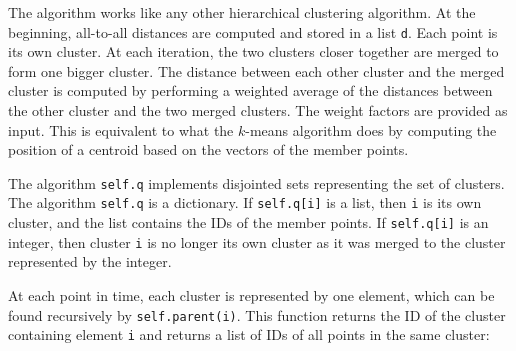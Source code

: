 \documentclass[justified,sixbynine]{tufte-book}
\def\ft{\small\tt}
\theoremstyle{plain}%
\theoremstyle{definition}
\theoremstyle{remark}
\begin{document}
\begin{fullwidth}
The algorithm works like any other hierarchical clustering algorithm. At the beginning, all-to-all distances are computed and stored in a list {\ft d}. Each point is its own cluster. At each iteration, the two clusters closer together are merged to form one bigger cluster. The distance between each other cluster and the merged cluster is computed by performing a weighted average of the distances between the other cluster and the two merged clusters. The weight factors are provided as input. This is equivalent to what the $k$-means algorithm does by computing the position of a centroid based on the vectors of the member points.

The algorithm {\ft self.q} implements disjointed sets representing the set of clusters. The algorithm {\ft self.q} is a dictionary. If {\ft self.q[i]} is a list, then {\ft i} is its own cluster, and the list contains the IDs of the member points. If  {\ft self.q[i]} is an integer, then cluster {\ft i} is no longer its own cluster as it was merged to the cluster represented by the integer.

At each point in time, each cluster is represented by one element, which can be found recursively by {\ft self.parent(i)}. This function returns the ID of the cluster containing element {\ft i} and returns a list of IDs of all points in the same cluster:



\end{fullwidth}
\end{document}
